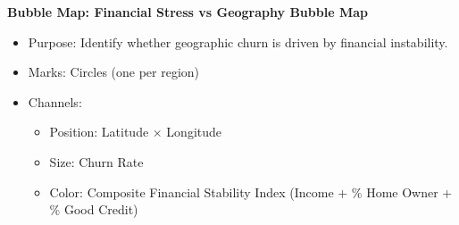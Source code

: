 \documentclass[10pt,a4paper]{article}
\begin{document}
\textbf{Bubble Map: Financial Stress vs Geography Bubble Map}
\begin{itemize}[itemsep=0pt]
    \item Purpose: Identify whether geographic churn is driven by financial instability.
    \item Marks: Circles (one per region)
    \item Channels:
    \begin{itemize}[itemsep=0pt]
        \item Position: Latitude × Longitude
        \item Size: Churn Rate
        \item Color: Composite Financial Stability Index (Income + \% Home Owner + \% Good Credit)
    \end{itemize}
\end{itemize}
\end{document}
